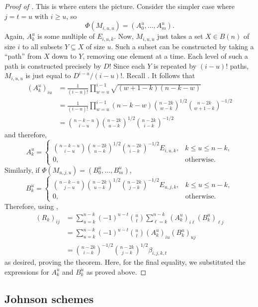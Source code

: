 \begin{proof}[Proof of ]
		This is where  enters the picture. Consider the simpler case where $j=t=u$ with $i \ge u$, so
		\[ \Phi(M_{i,u,u}) = (A_0^u,\ldots,A_m^u). \]
		Again, $A_k^u$ is some multiple of $E_{i,u,k}$. Now, $M_{i,u,u}$ just takes a set $X \in B(n)$ of size $i$ to all subsets $Y \subseteq X$ of size $u$. Such a subset can be constructed by taking a ``path'' from $X$ down to $Y$, removing one element at a time. Each level of such a path is constructed precisely by $D$! Since each $Y$ is repeated by $(i-u)!$ paths, $M_{i,u,u}$ is just equal to $D^{i-u}/(i-u)!$. Recall . It follows that
		\begin{align*}
			(A_k^u)_{iu} &= \frac{1}{(i-u)!} \prod_{w=u}^{i-1} \sqrt{(w+1-k)(n-k-w)} \\
				&= \frac{1}{(i-u)!} \prod_{w=u}^{i-1} (n-k-w) \binom{n-2k}{w-k}^{1/2} \binom{n-2k}{w+1-k}^{-1/2} \\
				&= \binom{n-k-u}{i-u} \binom{n-2k}{u-k}^{1/2} \binom{n-2k}{i-k}^{-1/2}
		\end{align*}
		and therefore,
		\[ A_k^u = \begin{cases} \binom{n-k-u}{i-u} \binom{n-2k}{u-k}^{1/2} \binom{n-2k}{i-k}^{-1/2} E_{i,u,k}, & k \le u \le n-k, \\ 0, & \text{otherwise.} \end{cases} \]
		Similarly, if $\Phi(M_{u,j,u}) = (B_0^u,\ldots,B_m^u)$,
		\[ B_k^u = \begin{cases} \binom{n-k-u}{j-u} \binom{n-2k}{u-k}^{1/2} \binom{n-2k}{j-k}^{-1/2} E_{u,j,k}, & k \le u \le n-k, \\ 0, & \text{otherwise.} \end{cases} \]
		Therefore, using ,
		\begin{align*}
			(R_k)_{ij} &= \sum_{u=k}^{n-k} (-1)^{u-t} \binom{u}{t} \sum_{\ell=k}^{n-k} (A_k^u)_{i\ell} (B_k^u)_{\ell j} \\
				&= \sum_{u=k}^{n-k} (-1)^{u-t} \binom{u}{t} (A_k^u)_{iu} (B_k^u)_{uj} \\
				&= \binom{n-2k}{i-k}^{-1/2} \binom{n-2k}{j-k}^{1/2} \beta_{i,j,k,t}
		\end{align*}
		as desired, proving the theorem. Here, for the final equality, we substituted the expressions for $A_k^u$ and $B_k^u$ as proved above.
	\end{proof}

\subsection{Johnson schemes}
\label{subsec:johnson-schemes}

